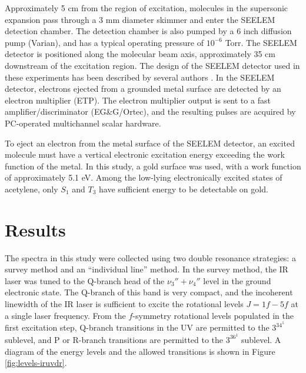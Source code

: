 Approximately 5 cm from the region of excitation, molecules in the
supersonic expansion pass through a 3 mm diameter skimmer and enter
the SEELEM detection chamber.  The detection chamber is also pumped by
a 6 inch diffusion pump (Varian), and has a typical operating pressure
of $10^{-6}$ Torr.  The SEELEM detector is positioned along the
molecular beam axis, approximately 35 cm downstream of the excitation
region.  The design of the SEELEM detector used in these experiments
has been described by several authors \cite{cunningham-thesis,
  altunata-thesis}.  In the SEELEM detector, electrons
ejected from a grounded metal surface are detected by an electron
multiplier (ETP).  The electron multiplier output is sent to a fast
amplifier/discriminator (EG\&G/Ortec), and the resulting pulses are
acquired by PC-operated multichannel scalar hardware.

To eject an electron from the metal surface of the SEELEM detector, an
excited molecule must have a vertical electronic excitation energy
exceeding the work function of the metal.  In this study, a gold
surface was used, with a work function of approximately 5.1 eV.
Among the low-lying electronically excited states of acetylene, only
$S_1$ and $T_3$ have sufficient energy to be detectable on gold.





















\section{Results}

The spectra in this study were collected using two double resonance
strategies: a survey method and an ``individual line'' method.  In the
survey method, the IR laser was tuned to the Q-branch head of the
$\nu_3''+\nu_4''$ level in the ground electronic state.  The Q-branch of
this band is very compact, and the incoherent linewidth of the IR
laser is sufficient to excite the rotational levels $J=1f-5f$ at a
single laser frequency.  From the $f$-symmetry rotational levels
populated in the first excitation step, Q-branch transitions in the UV
are permitted to the $3^34^1$  sublevel, and P or R-branch
transitions are permitted to the $3^36^1$  sublevel.  A diagram
of the energy levels and the allowed transitions is shown in Figure
\ref{fig:levels-iruvdr}.

